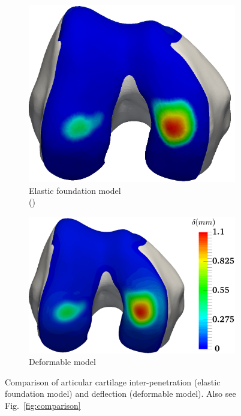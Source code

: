 \begin{figure}[ht!]
	\centering
	\begin{subfigure}{0.48\columnwidth}
		\centering \hskip -5mm
		\includegraphics[height=0.65\textwidth]{images/AC/Comp-Sol.png}
		\caption*{\hspace{-0.5cm}Elastic foundation model \\ \hspace{-0.5cm}(\cite{Smith2016})}
	\end{subfigure}
	\begin{subfigure}{0.48\columnwidth}
		\centering
		\includegraphics[height=0.65\textwidth]{images/AC/Comp-Def.png}
		\caption*{\hspace{-2cm} Deformable model }
	\end{subfigure}	
	\caption{Comparison of articular cartilage inter-penetration (elastic foundation model) and deflection (deformable model). Also see Fig.~\ref{fig:comparison}}\label{fig:deflection}
	\end{figure}
